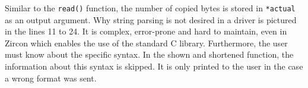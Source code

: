 %
%
%
Similar to the \texttt{read()} function, the number of copied bytes is stored in \texttt{*actual} as an output argument.
Why string parsing is not desired in a driver is pictured in the lines 11 to 24.
It is complex, error-prone and hard to maintain, even in Zircon which enables the use of the standard C library.
Furthermore, the user must know about the specific syntax.
In the shown and shortened function, the information about this syntax is skipped.
It is only printed to the user in the case a wrong format was sent.

